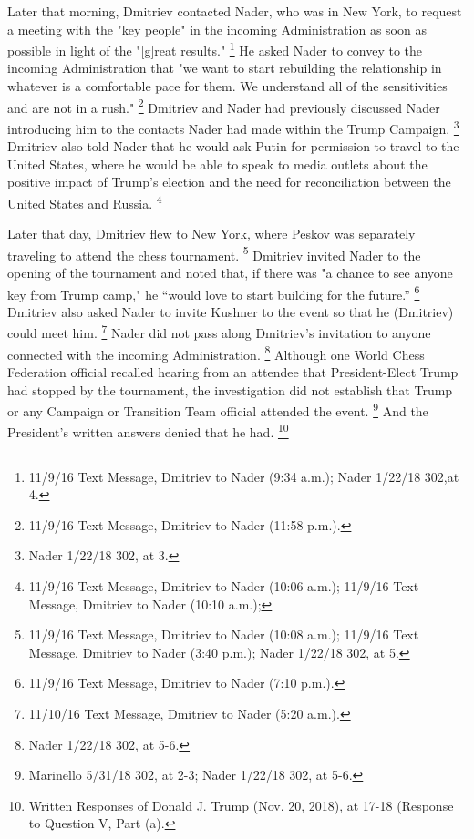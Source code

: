 Later that morning, Dmitriev contacted Nader, who was in New York, to request a meeting with the "key people" in the incoming Administration as soon as possible in light of the "[g]reat results."%
\footnote{11/9/16 Text Message, Dmitriev to Nader (9:34 a.m.);
Nader 1/22/18 302,at 4.}
He asked Nader to convey to the incoming Administration that "we want to start rebuilding the relationship in whatever is a comfortable pace for them.
We understand all of the sensitivities and are not in a rush."%
\footnote{11/9/16 Text Message, Dmitriev to Nader (11:58 p.m.).}
Dmitriev and Nader had previously discussed Nader introducing him to the contacts Nader had made within the Trump Campaign.%
\footnote{Nader 1/22/18 302, at 3.}
Dmitriev also told Nader that he would ask Putin for permission to travel to the United States, where he would be able to speak to media outlets about the positive impact of Trump's election and the need for reconciliation between the United States and Russia.%
\footnote{11/9/16 Text Message, Dmitriev to Nader (10:06 a.m.);
11/9/16 Text Message, Dmitriev to Nader (10:10 a.m.);
}

Later that day, Dmitriev flew to New York, where Peskov was separately traveling to attend the chess tournament.%
\footnote{11/9/16 Text Message, Dmitriev to Nader (10:08 a.m.);
11/9/16 Text Message, Dmitriev to Nader (3:40 p.m.);
Nader 1/22/18 302, at 5.}
Dmitriev invited Nader to the opening of the tournament and noted that, if there was "a chance to see anyone key from Trump camp," he ``would love to start building for the future.''%
\footnote{11/9/16 Text Message, Dmitriev to Nader (7:10 p.m.).}
Dmitriev also asked Nader to invite Kushner to the event so that he (Dmitriev) could meet him.%
\footnote{11/10/16 Text Message, Dmitriev to Nader (5:20 a.m.).}
Nader did not pass along Dmitriev's invitation to anyone connected with the incoming Administration.%
\footnote{Nader 1/22/18 302, at 5-6.}
Although one World Chess Federation official recalled hearing from an attendee that President-Elect Trump had stopped by the tournament, the investigation did not establish that Trump or any Campaign or Transition Team official attended the event.%
\footnote{Marinello 5/31/18 302, at 2-3;
Nader 1/22/18 302, at 5-6.}
And the President's written answers denied that he had.%
\footnote{Written Responses of Donald J. Trump (Nov. 20, 2018), at 17-18 (Response to Question V, Part (a).}

